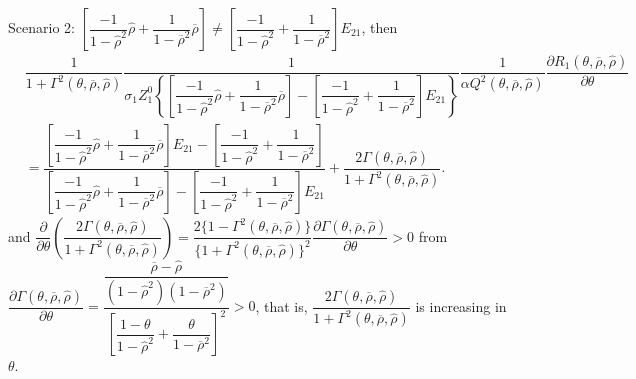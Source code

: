 \documentclass[10pt]{article}
\begin{document}
Scenario 2: {\footnotesize $ \left[ \dfrac{- 1}{1 - {\hat \rho}^2} {\hat \rho} + \dfrac1{1 - \overline{\rho}^2} \overline{\rho} \right] \neq \left[ \dfrac{- 1}{1 - {\hat \rho}^2} + \dfrac1{1 - \overline{\rho}^2} \right] E_{2 1} $}, then
{\footnotesize \begin{eqnarray*}
& \dfrac1{1 + \Gamma^2 (\theta, \overline{\rho}, {\hat \rho})} \dfrac1{\sigma_1 Z_1^0 \left\{ \left[ \dfrac{- 1}{1 - {\hat \rho}^2} {\hat \rho} + \dfrac1{1 - \overline{\rho}^2} \overline{\rho} \right] - \left[ \dfrac{- 1}{1 - {\hat \rho}^2} + \dfrac1{1 - \overline{\rho}^2} \right] E_{2 1} \right\}} \dfrac{1}{\alpha Q^2 (\theta, \overline{\rho}, {\hat \rho})} \dfrac{\partial R_1 (\theta, \overline{\rho}, {\hat \rho})}{\partial \theta} & \\
& = \dfrac{\left[ \dfrac{- 1}{1 - {\hat \rho}^2} {\hat \rho} + \dfrac1{1 - \overline{\rho}^2} \overline{\rho} \right] E_{2 1} - \left[ \dfrac{- 1}{1 - {\hat \rho}^2} + \dfrac1{1 - \overline{\rho}^2} \right]}{\left[ \dfrac{- 1}{1 - {\hat \rho}^2} {\hat \rho} + \dfrac1{1 - \overline{\rho}^2} \overline{\rho} \right] - \left[ \dfrac{- 1}{1 - {\hat \rho}^2} + \dfrac1{1 - \overline{\rho}^2} \right] E_{2 1}} + \dfrac{2 \Gamma (\theta, \overline{\rho}, {\hat \rho})}{1 + \Gamma^2 (\theta, \overline{\rho}, {\hat \rho})}. &
\end{eqnarray*}}
and {\footnotesize $ \dfrac{\partial}{\partial \theta} \left( \dfrac{2 \Gamma (\theta, \overline{\rho}, {\hat \rho})}{1 + \Gamma^2 (\theta, \overline{\rho}, {\hat \rho})} \right) = \dfrac{2 \{ 1 - \Gamma^2 (\theta, \overline{\rho}, {\hat \rho}) \}}{\{ 1 + \Gamma^2 (\theta, \overline{\rho}, {\hat \rho}) \}^2} \dfrac{\partial \Gamma (\theta, \overline{\rho}, {\hat \rho})}{\partial \theta} > 0 $} from {\footnotesize $ \dfrac{\partial \Gamma (\theta, \overline{\rho}, {\hat \rho})}{\partial \theta} = \dfrac{\dfrac{\overline{\rho} - \hat{\rho}}{(1 - {\hat \rho}^2) (1 - \overline{\rho}^2)}}{\left[ \dfrac{1 - \theta}{1 - {\hat \rho}^2} + \dfrac{\theta}{1 - \overline{\rho}^2} \right]^2} > 0 $}, that is, {\footnotesize $ \dfrac{2 \Gamma (\theta, \overline{\rho}, {\hat \rho})}{1 + \Gamma^2 (\theta, \overline{\rho}, {\hat \rho})} $} is increasing in $ \theta $.
\end{document}
